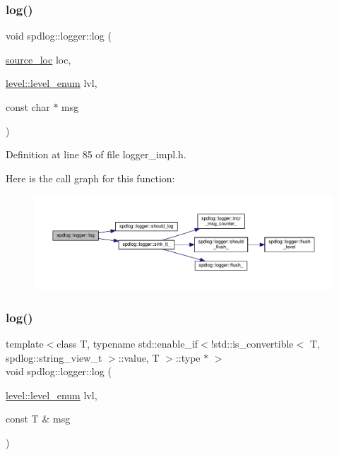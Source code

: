 \subsubsection{\texorpdfstring{log()}{log()}\hspace{0.1cm}{\footnotesize\ttfamily [4/8]}}
{\footnotesize\ttfamily void spdlog\+::logger\+::log (\begin{DoxyParamCaption}\item[{\hyperlink{structspdlog_1_1source__loc}{source\+\_\+loc}}]{loc,  }\item[{\hyperlink{namespacespdlog_1_1level_a35f5227e5daf228d28a207b7b2aefc8b}{level\+::level\+\_\+enum}}]{lvl,  }\item[{const char $\ast$}]{msg }\end{DoxyParamCaption})\hspace{0.3cm}{\ttfamily [inline]}}



Definition at line 85 of file logger\+\_\+impl.\+h.

Here is the call graph for this function\+:
\nopagebreak
\begin{figure}[H]
\begin{center}
\leavevmode
\includegraphics[width=350pt]{classspdlog_1_1logger_abf7d5c94e0c295aa2e55e1139b787a57_cgraph}
\end{center}
\end{figure}
\mbox{\label{classspdlog_1_1logger_a706ca9501457bdda5562cf0dffeca712}} 
\subsubsection{\texorpdfstring{log()}{log()}\hspace{0.1cm}{\footnotesize\ttfamily [5/8]}}
{\footnotesize\ttfamily template$<$class T, typename std\+::enable\+\_\+if$<$!std\+::is\+\_\+convertible$<$ T, spdlog\+::string\+\_\+view\+\_\+t $>$\+::value, T $>$\+::type $\ast$ $>$ \\
void spdlog\+::logger\+::log (\begin{DoxyParamCaption}\item[{\hyperlink{namespacespdlog_1_1level_a35f5227e5daf228d28a207b7b2aefc8b}{level\+::level\+\_\+enum}}]{lvl,  }\item[{const T \&}]{msg }\end{DoxyParamCaption})\hspace{0.3cm}{\ttfamily [inline]}}



